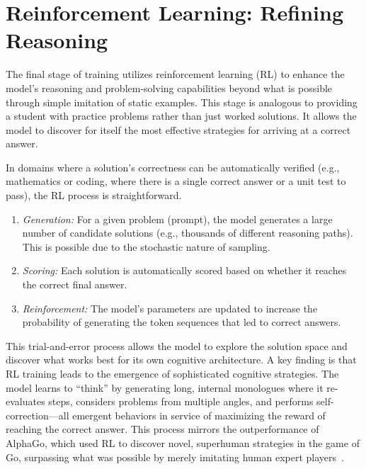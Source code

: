 \documentclass[%
  reprint,
  superscriptaddress,
  showpacs,
  showkeys,
  amsmath,amssymb,
  pra,
  longbibliography,
  floatfix,
  x11names
]{revtex4-2}
\begin{document}
\section{Reinforcement Learning: Refining Reasoning}
\label{sec:RL}

The final stage of training utilizes reinforcement learning (RL) to enhance the model's reasoning and problem-solving capabilities beyond what is possible through simple imitation of static examples. This stage is analogous to providing a student with practice problems rather than just worked solutions. It allows the model to discover for itself the most effective strategies for arriving at a correct answer.


In domains where a solution's correctness can be automatically verified (e.g., mathematics or coding, where there is a single correct answer or a unit test to pass), the RL process is straightforward.
\begin{enumerate}
    \item \textit{Generation:} For a given problem (prompt), the model generates a large number of candidate solutions (e.g., thousands of different reasoning paths). This is possible due to the stochastic nature of sampling.
    \item \textit{Scoring:} Each solution is automatically scored based on whether it reaches the correct final answer.
    \item \textit{Reinforcement:} The model's parameters are updated to increase the probability of generating the token sequences that led to correct answers.
\end{enumerate}

This trial-and-error process allows the model to explore the solution space and discover what works best for its own cognitive architecture. A key finding is that RL training leads to the emergence of sophisticated cognitive strategies. The model learns to ``think'' by generating long, internal monologues where it re-evaluates steps, considers problems from multiple angles, and performs self-correction---all emergent behaviors in service of maximizing the reward of reaching the correct answer. This process mirrors the outperformance of AlphaGo, which used RL to discover novel, superhuman strategies in the game of Go,
surpassing what was possible by merely imitating human expert players~\cite[Fig.~3a]{Silver-2017}.
\end{document}
